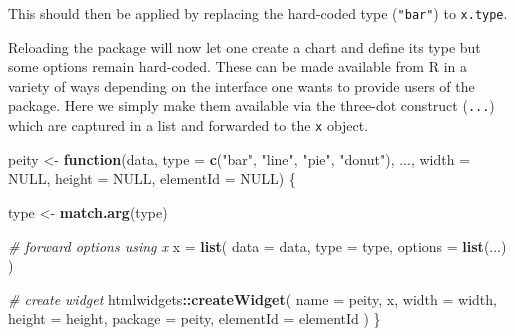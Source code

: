 \documentclass[
]{krantz}
\makeatletter
\newenvironment{Shaded}{\begin{snugshade}}{\end{snugshade}}
\newcommand{\AttributeTok}[1]{\textcolor[rgb]{0.61,0.61,0.61}{#1}}
\newcommand{\CommentTok}[1]{\textcolor[rgb]{0.37,0.37,0.37}{\textit{#1}}}
\newcommand{\ControlFlowTok}[1]{\textcolor[rgb]{0.27,0.27,0.27}{\textbf{#1}}}
\newcommand{\DataTypeTok}[1]{\textcolor[rgb]{0.27,0.27,0.27}{#1}}
\newcommand{\FunctionTok}[1]{\textcolor[rgb]{0,0,0}{#1}}
\newcommand{\KeywordTok}[1]{\textcolor[rgb]{0.27,0.27,0.27}{\textbf{#1}}}
\newcommand{\NormalTok}[1]{#1}
\newcommand{\OperatorTok}[1]{\textcolor[rgb]{0.43,0.43,0.43}{\textbf{#1}}}
\newcommand{\OtherTok}[1]{\textcolor[rgb]{0.37,0.37,0.37}{#1}}
\newcommand{\StringTok}[1]{\textcolor[rgb]{0.5,0.5,0.5}{#1}}
\newenvironment{kframe}{%
\medskip{}
\setlength{\fboxsep}{.8em}
 \def\at@end@of@kframe{}%
 \ifinner\ifhmode%
  \def\at@end@of@kframe{\end{minipage}}%
  \begin{minipage}{\columnwidth}%
 \fi\fi%
 \def\FrameCommand##1{\hskip\@totalleftmargin \hskip-\fboxsep
 \colorbox{shadecolor}{##1}\hskip-\fboxsep
     \hskip-\linewidth \hskip-\@totalleftmargin \hskip\columnwidth}%
 \MakeFramed {\advance\hsize-\width
   \@totalleftmargin\z@ \linewidth\hsize
   \@setminipage}}%
 {\par\unskip\endMakeFramed%
 \at@end@of@kframe}
\renewenvironment{Shaded}{\begin{kframe}}{\end{kframe}}
\makeatother
\begin{document}
This should then be applied by replacing the hard-coded type (\texttt{"bar"}) to \texttt{x.type}.

\begin{Shaded}
\end{Shaded}

Reloading the package will now let one create a chart and define its type but some options remain hard-coded. These can be made available from R in a variety of ways depending on the interface one wants to provide users of the package. Here we simply make them available via the three-dot construct (\texttt{...}) which are captured in a list and forwarded to the \texttt{x} object.

\begin{Shaded}
\begin{Highlighting}[]
\NormalTok{peity \textless{}{-}}\StringTok{ }\ControlFlowTok{function}\NormalTok{(data, }\DataTypeTok{type =} \KeywordTok{c}\NormalTok{(}\StringTok{"bar"}\NormalTok{, }\StringTok{"line"}\NormalTok{, }\StringTok{"pie"}\NormalTok{, }\StringTok{"donut"}\NormalTok{), ...,}
  \DataTypeTok{width =} \OtherTok{NULL}\NormalTok{, }\DataTypeTok{height =} \OtherTok{NULL}\NormalTok{, }\DataTypeTok{elementId =} \OtherTok{NULL}\NormalTok{) \{}

\NormalTok{  type \textless{}{-}}\StringTok{ }\KeywordTok{match.arg}\NormalTok{(type)}

  \CommentTok{\# forward options using x}
\NormalTok{  x =}\StringTok{ }\KeywordTok{list}\NormalTok{(}
    \DataTypeTok{data =}\NormalTok{ data,}
    \DataTypeTok{type =}\NormalTok{ type,}
    \DataTypeTok{options =} \KeywordTok{list}\NormalTok{(...)}
\NormalTok{  )}

  \CommentTok{\# create widget}
\NormalTok{  htmlwidgets}\OperatorTok{::}\KeywordTok{createWidget}\NormalTok{(}
    \DataTypeTok{name =} \StringTok{\textquotesingle{}peity\textquotesingle{}}\NormalTok{,}
\NormalTok{    x,}
    \DataTypeTok{width =}\NormalTok{ width,}
    \DataTypeTok{height =}\NormalTok{ height,}
    \DataTypeTok{package =} \StringTok{\textquotesingle{}peity\textquotesingle{}}\NormalTok{,}
    \DataTypeTok{elementId =}\NormalTok{ elementId}
\NormalTok{  )}
\NormalTok{\}}
\end{Highlighting}
\end{Shaded}
\end{document}
